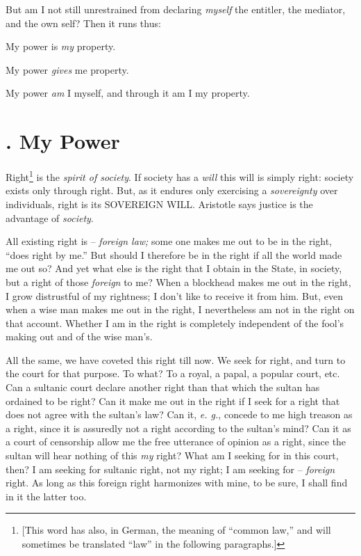 \documentclass[12pt,a4paper]{book}
\begin{document}
But am I not still unrestrained from declaring \textit{myself} the entitler, 
the mediator, and the own self? Then it runs thus:

My power is \textit{my} property.

My power \textit{gives} me property.

My power \textit{am} I myself, and through it am I my property.

\section[1. My Power]{. My Power}

Right\footnote{[This word has also, in German, the meaning of ``common 
law,'' and will sometimes be translated ``law'' in the following 
paragraphs.]} is the \textit{spirit of society}. If society has a 
\textit{will} this will is simply right: society exists only through right. 
But, as it endures only exercising a \textit{sovereignty} over individuals, 
right is its SOVEREIGN WILL. Aristotle says justice is the advantage of 
\textit{society}.

All existing right is -- \textit{foreign law;} some one makes me out to be in 
the right, ``does right by me.'' But should I therefore be in the right if 
all the world made me out so? And yet what else is the right that I obtain in 
the State, in society, but a right of those \textit{foreign} to me? When a 
blockhead makes me out in the right, I grow distrustful of my rightness; I 
don't like to receive it from him. But, even when a wise man makes me out in 
the right, I nevertheless am not in the right on that account. Whether I am in 
the right is completely independent of the fool's making out and of the wise 
man's.

All the same, we have coveted this right till now. We seek for right, and turn 
to the court for that purpose. To what? To a royal, a papal, a popular court, 
etc. Can a sultanic court declare another right than that which the sultan has 
ordained to be right? Can it make me out in the right if I seek for a right 
that does not agree with the sultan's law? Can it, \textit{e. g.}, concede to 
me high treason as a right, since it is assuredly not a right according to the 
sultan's mind? Can it as a court of censorship allow me the free utterance of 
opinion as a right, since the sultan will hear nothing of this \textit{my} 
right? What am I seeking for in this court, then? I am seeking for sultanic 
right, not my right; I am seeking for -- \textit{foreign} right. As long as 
this foreign right harmonizes with mine, to be sure, I shall find in it the 
latter too.
\end{document}
